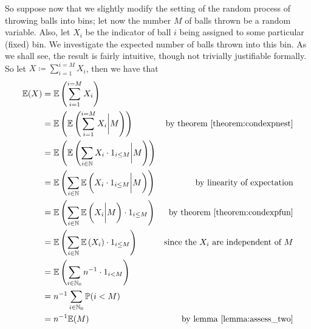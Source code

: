 	So suppose now that we slightly modify the setting of the random process of throwing balls 
	into bins; let now the number $M$ of balls thrown be a random variable. Also, let $X_i$ be 
	the indicator of ball $i$ being assigned to some particular (fixed) bin. We investigate 
	the expected number of balls thrown into this bin. As we shall see, the result is fairly 
	intuitive, though not trivially justifiable formally.\\
	So let $X \coloneqq \sum_{i=1}^{i=M}X_i$, then we have that 
	\begin{align*}
		\mathbb{E}(X) &= \mathbb{E}\left(\sum_{i=1}^{i=M}X_i\right) \\
		&= \mathbb{E}\left(\mathbb{E}\left(\sum_{i=1}^{i=M}X_i \bigg| M\right)\right) 
		&\text{by theorem \ref{theorem:condexpnest}}\\
		&= \mathbb{E}\left(\mathbb{E}\left(\sum_{i\in\mathbb{N}}X_i\cdot 1_{i\leq M} 
		\bigg| M\right)\right) 
		\\
		&= \mathbb{E}\left(\sum_{i\in \mathbb{N}}\mathbb{E}\left(X_i\cdot 1_{i\leq M} 
		\bigg| M\right)\right) 
		&\text{by linearity of expectation}\\
		&= \mathbb{E}\left(\sum_{i\in \mathbb{N}}\mathbb{E}\left(X_i 
		\bigg| M\right)\cdot 1_{i\leq M}\right) 
		&\text{by theorem \ref{theorem:condexpfun}}\\
		&= \mathbb{E}\left(\sum_{i\in \mathbb{N}}\mathbb{E}\left(X_i\right)\cdot 
		1_{i\leq M}\right) 
		&\text{since the $X_i$ are independent of $M$}\\
		&= \mathbb{E}\left(\sum_{i\in \mathbb{N}_0}n^{-1}\cdot 
		1_{i< M}\right) \\
		&= n^{-1} \sum_{i\in\mathbb{N}_0}\mathbb{P}(i< M) \\
		&= n^{-1} \mathbb{E}(M) &\text{by lemma \ref{lemma:assess_two}}
	\end{align*}

